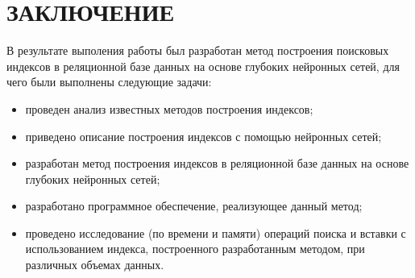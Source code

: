 \chapter*{ЗАКЛЮЧЕНИЕ}


В результате выполения работы был разработан метод построения поисковых индексов
в реляционной базе данных на основе глубоких нейронных сетей, для чего были
выполнены следующие задачи:

\begin{itemize}
    \item проведен анализ известных методов построения индексов;
    \item приведено описание построения индексов с помощью нейронных сетей;
    \item разработан метод построения индексов в реляционной базе
        данных на основе глубоких нейронных сетей;
    \item разработано программное обеспечение, реализующее данный метод;
    \item проведено исследование (по времени и памяти) операций поиска и вставки
        с использованием индекса, построенного разработанным методом, при
        различных объемах данных.
\end{itemize}
